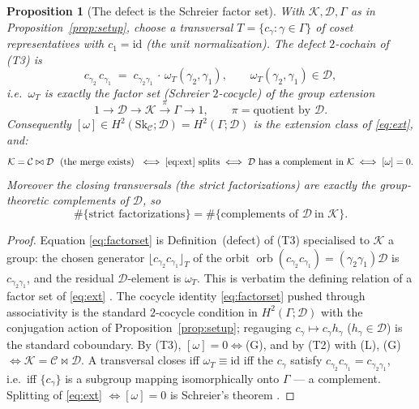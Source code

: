 \documentclass[11pt]{article}
\newtheorem{proposition}[theorem]{Proposition}
\theoremstyle{definition}
\newcommand{\id}{\mathrm{id}}
\newcommand{\C}{\mathcal{C}}
\newcommand{\D}{\mathcal{D}}
\newcommand{\K}{\mathcal{K}}
\newcommand{\Sk}{\mathrm{Sk}}
\newcommand{\orb}{\operatorname{orb}}
\begin{document}
\begin{proposition}[The defect is the Schreier factor set]\label{prop:schreier}
With $\K,\D,\Gamma$ as in Proposition~\ref{prop:setup}, choose a transversal
$T=\{c_\gamma:\gamma\in\Gamma\}$ of coset representatives with $c_{1}=\id$ (the
unit normalization). The defect $2$-cochain of \textnormal{(T3)} is
\begin{equation}\label{eq:factorset}
   c_{\gamma_2}\,c_{\gamma_1}
     \;=\; c_{\gamma_2\gamma_1}\,\cdot\,\omega_T(\gamma_2,\gamma_1),
   \qquad \omega_T(\gamma_2,\gamma_1)\in\D ,
\end{equation}
i.e.\ $\omega_T$ is exactly the \emph{factor set} (Schreier $2$-cocycle) of the
group extension
\begin{equation}\label{eq:ext}
   1\longrightarrow \D \longrightarrow \K \xrightarrow{\;\pi\;} \Gamma
     \longrightarrow 1 ,\qquad \pi=\text{quotient by }\D .
\end{equation}
Consequently $[\omega]\in H^2(\Sk_\C;\D)=H^2(\Gamma;\D)$ is the extension class of
\eqref{eq:ext}, and:
\[
   \K=\C\bowtie\D \ \text{ (the merge exists) }
   \iff \eqref{eq:ext}\ \text{splits}
   \iff \D\ \text{has a complement in }\K
   \iff [\omega]=0 .
\]
Moreover the closing transversals (the strict factorizations) are exactly the
group-theoretic complements of $\D$, so
\[
   \#\{\text{strict factorizations}\}=\#\{\text{complements of }\D\ \text{in }\K\}.
\]
\end{proposition}
\begin{proof}
Equation \eqref{eq:factorset} is Definition~(defect) of \textnormal{(T3)}
specialised to $\K$ a group: the chosen generator $\lfloor c_{\gamma_2}c_{\gamma_1}
\rfloor_T$ of the orbit $\orb(c_{\gamma_2}c_{\gamma_1})=(\gamma_2\gamma_1)\D$ is
$c_{\gamma_2\gamma_1}$, and the residual $\D$-element is $\omega_T$. This is
verbatim the defining relation of a factor set of \eqref{eq:ext}
\cite{maclane,brown}. The cocycle identity \eqref{eq:factorset} pushed through
associativity is the standard $2$-cocycle condition in $H^2(\Gamma;\D)$ with the
conjugation action of Proposition~\ref{prop:setup}; regauging
$c_\gamma\mapsto c_\gamma h_\gamma$ ($h_\gamma\in\D$) is the standard coboundary.
By \textnormal{(T3)}, $[\omega]=0\iff$\textnormal{(G)}, and by \textnormal{(T2)}
with \textnormal{(L)}, \textnormal{(G)}$\iff\K=\C\bowtie\D$. A transversal closes
iff $\omega_T\equiv\id$ iff the $c_\gamma$ satisfy $c_{\gamma_2}c_{\gamma_1}
=c_{\gamma_2\gamma_1}$, i.e.\ iff $\{c_\gamma\}$ is a subgroup mapping isomorphically
onto $\Gamma$ --- a complement. Splitting of \eqref{eq:ext} $\iff[\omega]=0$ is
Schreier's theorem \cite{maclane,brown}.
\end{proof}
\end{document}
